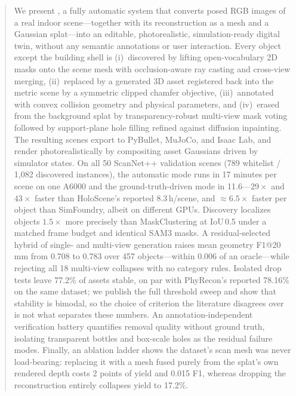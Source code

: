\begin{abstract}
We present \name, a fully automatic system that converts posed RGB images
of a real indoor scene---together with its reconstruction as a mesh and a
Gaussian splat---into an editable, photorealistic, simulation-ready
digital twin, without any semantic annotations or user interaction. Every
object except the building shell is (i)~discovered by lifting
open-vocabulary 2D masks onto the scene mesh with occlusion-aware ray
casting and cross-view merging, (ii)~replaced by a generated 3D asset
registered back into the metric scene by a symmetric clipped chamfer
objective, (iii)~annotated with convex collision geometry and physical
parameters, and (iv)~erased from the background splat by
transparency-robust multi-view mask voting followed by support-plane hole
filling refined against diffusion inpainting. The resulting scenes export
to PyBullet, MuJoCo, and Isaac Lab, and render photorealistically by
compositing asset Gaussians driven by simulator states.
On all 50 ScanNet++ validation scenes (789 whitelist / 1{,}082 discovered
instances), the automatic mode runs in 17 minutes per scene on one A6000
and the ground-truth-driven mode in 11.6---$29\times$ and $43\times$
faster than HoloScene's reported 8.3\,h/scene, and $\approx6.5\times$
faster per object than SimFoundry, albeit on different GPUs. Discovery
localizes objects $1.5\times$ more precisely than MaskClustering at
IoU\,0.5 under a matched frame budget and identical SAM3 masks. A
residual-selected hybrid of single- and multi-view generation raises mean
geometry F1@20\,mm from 0.708 to 0.783 over 457 objects---within 0.006 of
an oracle---while rejecting all 18 multi-view collapses with no category
rules. Isolated drop tests leave 77.2\% of assets stable, on par with
PhyRecon's reported 78.16\% on the same dataset; we publish the full
threshold sweep and show that stability is bimodal, so the choice of
criterion the literature disagrees over is not what separates these
numbers. An annotation-independent verification battery quantifies removal
quality without ground truth, isolating transparent bottles and box-scale
holes as the residual failure modes. Finally, an ablation ladder shows the
dataset's scan mesh was never load-bearing: replacing it with a mesh fused
purely from the splat's own rendered depth costs 2 points of yield and
0.015 F1, whereas dropping the reconstruction entirely collapses yield to
17.2\%.
\end{abstract}

